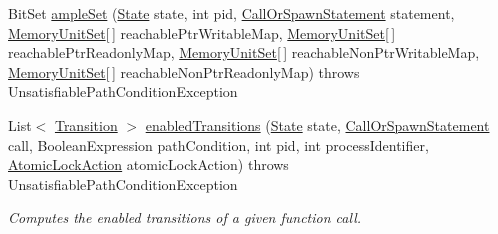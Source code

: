 \begin{DoxyCompactItemize}
Bit\+Set \hyperlink{classedu_1_1udel_1_1cis_1_1vsl_1_1civl_1_1library_1_1common_1_1BaseLibraryEnabler_a7adfa7cc7b1fc30c6c510e0b4c5f79c8}{ample\+Set} (\hyperlink{interfaceedu_1_1udel_1_1cis_1_1vsl_1_1civl_1_1state_1_1IF_1_1State}{State} state, int pid, \hyperlink{interfaceedu_1_1udel_1_1cis_1_1vsl_1_1civl_1_1model_1_1IF_1_1statement_1_1CallOrSpawnStatement}{Call\+Or\+Spawn\+Statement} statement, \hyperlink{interfaceedu_1_1udel_1_1cis_1_1vsl_1_1civl_1_1state_1_1IF_1_1MemoryUnitSet}{Memory\+Unit\+Set}\mbox{[}$\,$\mbox{]} reachable\+Ptr\+Writable\+Map, \hyperlink{interfaceedu_1_1udel_1_1cis_1_1vsl_1_1civl_1_1state_1_1IF_1_1MemoryUnitSet}{Memory\+Unit\+Set}\mbox{[}$\,$\mbox{]} reachable\+Ptr\+Readonly\+Map, \hyperlink{interfaceedu_1_1udel_1_1cis_1_1vsl_1_1civl_1_1state_1_1IF_1_1MemoryUnitSet}{Memory\+Unit\+Set}\mbox{[}$\,$\mbox{]} reachable\+Non\+Ptr\+Writable\+Map, \hyperlink{interfaceedu_1_1udel_1_1cis_1_1vsl_1_1civl_1_1state_1_1IF_1_1MemoryUnitSet}{Memory\+Unit\+Set}\mbox{[}$\,$\mbox{]} reachable\+Non\+Ptr\+Readonly\+Map)  throws Unsatisfiable\+Path\+Condition\+Exception 
\item 
List$<$ \hyperlink{interfaceedu_1_1udel_1_1cis_1_1vsl_1_1civl_1_1semantics_1_1IF_1_1Transition}{Transition} $>$ \hyperlink{classedu_1_1udel_1_1cis_1_1vsl_1_1civl_1_1library_1_1common_1_1BaseLibraryEnabler_aa02e5580539e71fd45208ae39ed9a9cc}{enabled\+Transitions} (\hyperlink{interfaceedu_1_1udel_1_1cis_1_1vsl_1_1civl_1_1state_1_1IF_1_1State}{State} state, \hyperlink{interfaceedu_1_1udel_1_1cis_1_1vsl_1_1civl_1_1model_1_1IF_1_1statement_1_1CallOrSpawnStatement}{Call\+Or\+Spawn\+Statement} call, Boolean\+Expression path\+Condition, int pid, int process\+Identifier, \hyperlink{enumedu_1_1udel_1_1cis_1_1vsl_1_1civl_1_1semantics_1_1IF_1_1Transition_1_1AtomicLockAction}{Atomic\+Lock\+Action} atomic\+Lock\+Action)  throws Unsatisfiable\+Path\+Condition\+Exception 
\begin{DoxyCompactList}\small\item\em Computes the enabled transitions of a given function call. \end{DoxyCompactList}\end{DoxyCompactItemize}
